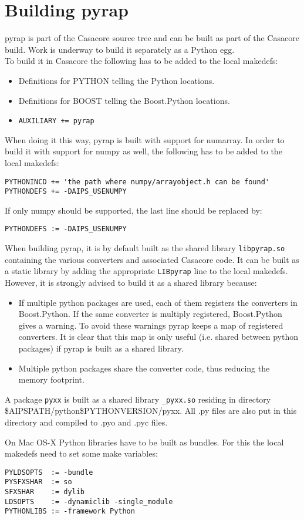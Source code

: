 \section{Building pyrap}
pyrap is part of the Casacore source tree and can be built as part of
the Casacore build. Work is underway to build it separately as a Python
egg.
\\To build it in Casacore the following has to be added to the local
makedefs:
\begin{itemize}
\item Definitions for PYTHON telling the Python locations.
\item Definitions for BOOST telling the Boost.Python locations.
\item \texttt{AUXILIARY += pyrap}
\end{itemize}
When doing it this way, pyrap is built with support for
numarray. In order to build it with support for numpy as well, the following
has to be added to the local makedefs:
\begin{verbatim}
PYTHONINCD += 'the path where numpy/arrayobject.h can be found'
PYTHONDEFS += -DAIPS_USENUMPY
\end{verbatim}
If only numpy should be supported, the last line should be replaced by:
\begin{verbatim}
PYTHONDEFS := -DAIPS_USENUMPY
\end{verbatim}
When building pyrap, it is by default built as the shared library
\texttt{libpyrap.so} 
containing the various converters and associated Casacore code. It can
be built as a static library by adding the appropriate
\texttt{LIBpyrap} line to the local makedefs. However, it is
strongly advised to build it as a shared library because:
\begin{itemize}
\item If multiple python packages are used, each of them registers the
  converters in Boost.Python. If the same converter is multiply
  registered, Boost.Python gives a warning. To avoid these warnings
  pyrap keeps a map of registered converters. It is clear that
  this map is only useful (i.e. shared between python packages)
  if pyrap is built as a shared library.
\item Multiple python packages share the converter code, thus reducing the
  memory footprint.
\end{itemize}

A package \texttt{pyxx} is built as a shared library
\texttt{\_pyxx.so} residing in directory 
\$AIPSPATH/python\$PYTHONVERSION/pyxx. All .py files are also put in this
directory and compiled to .pyo and .pyc files.

On Mac OS-X Python libraries have to be built as bundles. For this the
local makedefs need to set some make variables:
\begin{verbatim}
PYLDSOPTS  := -bundle
PYSFXSHAR  := so
SFXSHAR    := dylib
LDSOPTS    := -dynamiclib -single_module
PYTHONLIBS := -framework Python
\end{verbatim}
